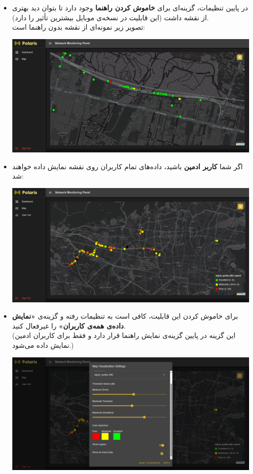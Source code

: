 \begin{itemize}
    \item در پایین تنظیمات، گزینه‌ای برای \textbf{خاموش کردن راهنما} وجود دارد تا بتوان دید بهتری از نقشه داشت (این قابلیت در نسخه‌ی موبایل بیشترین تأثیر را دارد).\\
    تصویر زیر نمونه‌ای از نقشه بدون راهنما است:
    \begin{center}
        \includegraphics[width=\textwidth]{images/map_latency_legends_off.png}
    \end{center}

    \item اگر شما \textbf{کاربر ادمین} باشید، داده‌های تمام کاربران روی نقشه نمایش داده خواهند شد:
    \begin{center}
        \includegraphics[width=\textwidth]{images/map_admin_all_data.png}
    \end{center}

    \item برای خاموش کردن این قابلیت، کافی است به تنظیمات رفته و گزینه‌ی \textbf{«نمایش داده‌ی همه‌ی کاربران»} را غیرفعال کنید.\\
    (این گزینه در پایین گزینه‌ی نمایش راهنما قرار دارد و فقط برای کاربران ادمین نمایش داده می‌شود.)
    \begin{center}
        \includegraphics[width=\textwidth]{images/admin_settings_all_users_button.png}
    \end{center}
\end{itemize}
